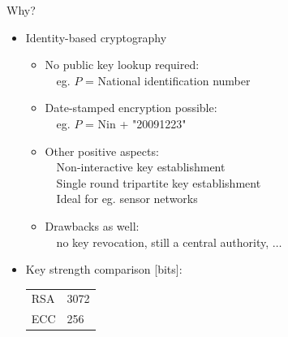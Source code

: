 \documentclass{beamer}
\begin{document}
\begin{frame}{Why?}
	\begin{itemize}
  		\item<1-> Identity-based cryptography\\
  			\begin{itemize}
				\item<1-> No public key lookup required:\\
					$\quad$eg. $P$ = National identification number
				\item<2-> Date-stamped encryption possible:\\
					$\quad$eg. $P$ = Nin + "20091223"
				\item<3-> Other positive aspects:\\
					$\quad$Non-interactive key establishment\\
					$\quad$Single round tripartite key establishment\\
					$\quad$Ideal for eg. sensor networks
				\item<4-> Drawbacks as well:\\
					$\quad$no key revocation, still a central authority, $\ldots$
			\end{itemize}
		\item<5-> Key strength comparison [bits]:\\
			\begin{tabular}{ll}
				RSA			&	3072\\
				\alert{ECC}	&	\alert{256}\\
			\end{tabular}
	\end{itemize}
\end{frame}

\end{document}

